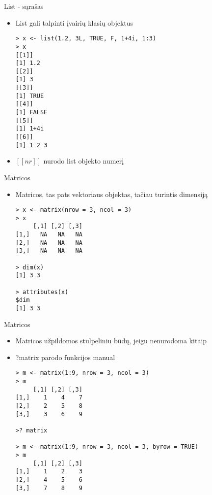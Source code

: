 \documentclass[11pt,xcolor=table]{beamer}
\begin{document}

\begin{frame}[fragile]{List - sąrašas}
\begin{itemize}
\item List gali talpinti įvairių klasių objektus
\begin{lstlisting}
> x <- list(1.2, 3L, TRUE, F, 1+4i, 1:3) 
> x
[[1]]
[1] 1.2
[[2]]
[1] 3
[[3]]
[1] TRUE
[[4]]
[1] FALSE
[[5]]
[1] 1+4i
[[6]]
[1] 1 2 3
\end{lstlisting}
\item $[[nr]]$  nurodo list objekto numerį
\end{itemize}
\end{frame}


\begin{frame}[fragile]{Matricos}
\begin{itemize}
\item Matricos, tas pats vektoriaus objektas, tačiau turintis dimensiją
\begin{lstlisting}
> x <- matrix(nrow = 3, ncol = 3)
> x
     [,1] [,2] [,3]
[1,]   NA   NA   NA
[2,]   NA   NA   NA
[3,]   NA   NA   NA

> dim(x)
[1] 3 3

> attributes(x)
$dim
[1] 3 3
\end{lstlisting}
\end{itemize}
\end{frame}


\begin{frame}[fragile]{Matricos}
\begin{itemize}
\item Matricos užpildomos stulpeliniu būdų, jeigu nenurodoma kitaip
\item ?matrix parodo funkcijos manual
\begin{lstlisting}
> m <- matrix(1:9, nrow = 3, ncol = 3)
> m
     [,1] [,2] [,3]
[1,]    1    4    7
[2,]    2    5    8
[3,]    3    6    9

>? matrix

> m <- matrix(1:9, nrow = 3, ncol = 3, byrow = TRUE)
> m
     [,1] [,2] [,3]
[1,]    1    2    3
[2,]    4    5    6
[3,]    7    8    9

\end{lstlisting}
\end{itemize}
\end{frame}
\end{document}
